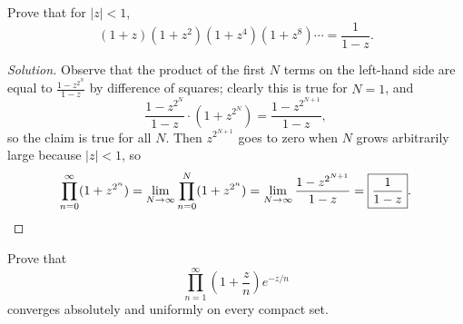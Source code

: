 \documentclass[10pt]{article}
\newenvironment{soln}{\begin{proof}[Solution]}{\end{proof}}
\providecommand{\abs}[1]{\left\lvert #1\right\rvert}
\providecommand{\paren}[1]{\left(#1\right)}
\begin{document}
\begin{problem}
    [p.193\#2]
    Prove that for $\abs z < 1$,
    \begin{equation*}
	(1 + z)(1 + z^2)(1 + z^4)(1 + z^8)\cdots = \frac 1{1-z}.
    \end{equation*}
\end{problem}

\begin{soln}
    Observe that the product of the first $N$ terms on the left-hand side
    are equal to $\frac{1 - z^{2^N}}{1-z}$ by difference of squares;
    clearly this is true for $N = 1$, and
    \begin{equation*}
	\frac{1 - z^{2^N}}{1-z}\cdot (1 + z^{2^N})
	= \frac{1 - z^{2^{N+1}}}{1 - z},
    \end{equation*}
    so the claim is true for all $N$. Then $z^{2^{N+1}}$ goes to zero
    when $N$ grows arbitrarily large because $\abs z < 1$, so
    \begin{equation*}
	\prod_{n=0}^\infty(1 + z^{2^n})
	= \lim_{N\to\infty}\prod_{n=0}^N (1 + z^{2^n})
	= \lim_{N\to\infty} \frac{1 - z^{2^{N+1}}}{1 - z}
	= \boxed{\frac 1{1-z}}.\qedhere
    \end{equation*}
\end{soln}

\begin{problem}
    [p.193\#3]
    Prove that
    \begin{equation*}
	\prod_{n=1}^\infty \paren{1 + \frac zn} e^{-z/n}
    \end{equation*}
    converges absolutely and uniformly on every compact set.
\end{problem}
\end{document}
